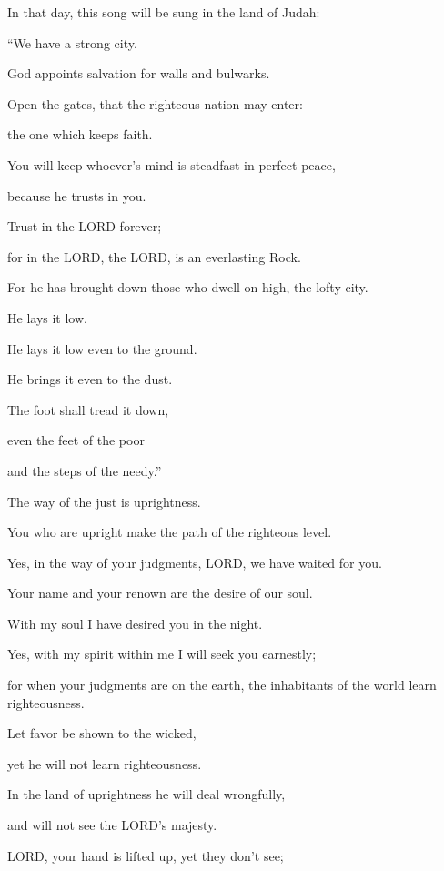 \mychapter{} \myverse*{}In that day, this song will be sung in the land of Judah:

\quad\quad “We have a strong city.

God appoints salvation for walls and bulwarks.

\myverse{}Open the gates, that the righteous nation may enter:

the one which keeps faith.

\myverse{}You will keep whoever’s mind is steadfast in perfect peace,

because he trusts in you.

\myverse{}Trust in the LORD forever;

for in the LORD, the LORD, is an everlasting Rock.

\myverse{}For he has brought down those who dwell on high, the lofty city.

He lays it low.

He lays it low even to the ground.

He brings it even to the dust.

\myverse{}The foot shall tread it down,

even the feet of the poor

and the steps of the needy.”

\myverse{}The way of the just is uprightness.

You who are upright make the path of the righteous level.


\vspace{\baselineskip} \myverse{}Yes, in the way of your judgments, LORD, we have waited for you.

Your name and your renown are the desire of our soul.

\myverse{}With my soul I have desired you in the night.

Yes, with my spirit within me I will seek you earnestly;

for when your judgments are on the earth, the inhabitants of the world learn righteousness.

\myverse{}Let favor be shown to the wicked,

yet he will not learn righteousness.

In the land of uprightness he will deal wrongfully,

and will not see the LORD’s majesty.


\vspace{\baselineskip} \myverse{}LORD, your hand is lifted up, yet they don’t see;

